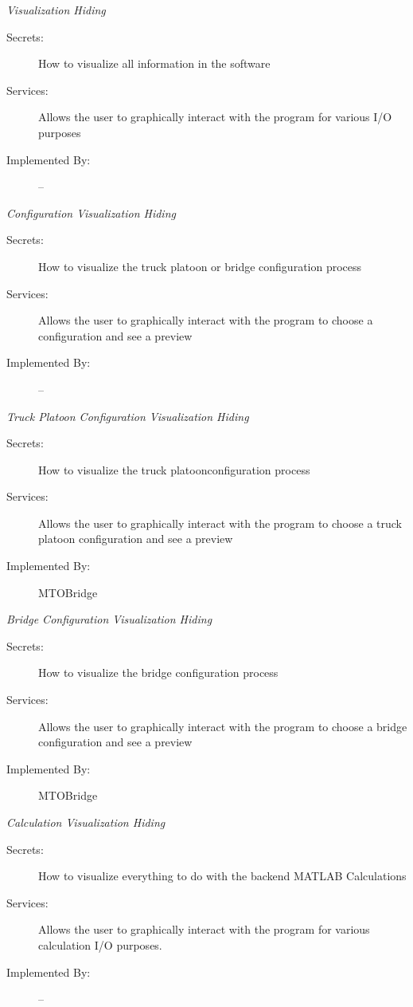 \documentclass[12pt, titlepage]{article}
\begin{document}
    \emph{{\large Visualization Hiding}}
    \begin{description}
        \item[Secrets:]How to visualize all information in the software
        \item[Services:]Allows the user to graphically interact with the program for various I/O purposes
        \item[Implemented By:] --\\
    \end{description}
    \emph{{\large Configuration Visualization Hiding}}
    \begin{description}
        \item[Secrets:]How to visualize the truck platoon or bridge configuration process
        \item[Services:]Allows the user to graphically interact with the program to choose a configuration and see a preview
        \item[Implemented By:] --\\
    \end{description}
    \emph{{\large Truck Platoon Configuration Visualization Hiding}}
    \begin{description}
        \item[Secrets:]How to visualize the truck platoonconfiguration process
        \item[Services:]Allows the user to graphically interact with the program to choose a truck platoon configuration and see a preview
        \item[Implemented By:] MTOBridge\\
    \end{description}
    \emph{{\large Bridge Configuration Visualization Hiding}}
    \begin{description}
        \item[Secrets:]How to visualize the bridge configuration process
        \item[Services:]Allows the user to graphically interact with the program to choose a bridge configuration and see a preview
        \item[Implemented By:] MTOBridge\\
    \end{description}
    \emph{{\large Calculation Visualization Hiding}}
    \begin{description}
        \item[Secrets:]How to visualize everything to do with the backend MATLAB Calculations
        \item[Services:]Allows the user to graphically interact with the program for various calculation I/O purposes.
        \item[Implemented By:] --\\
    \end{description}
\end{document}
